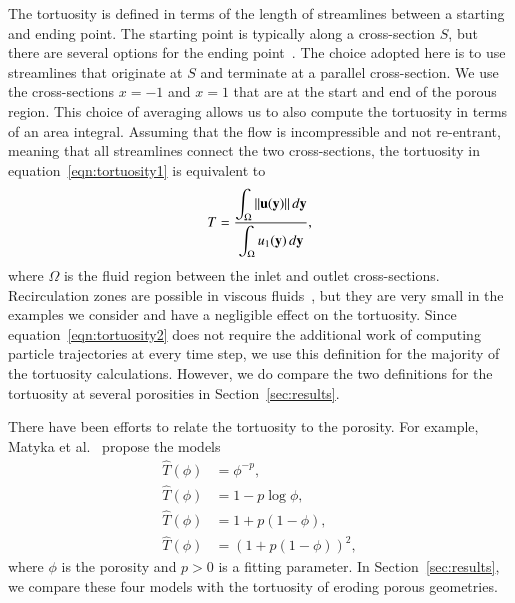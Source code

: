 \documentclass[preprint,10pt]{elsarticle}
\begin{document}
The tortuosity is defined in terms of the length of streamlines between
a starting and ending point. The starting point is typically along a
cross-section $S$, but there are several options for the ending
point~\cite{dud-koz-mat2011}.  The choice adopted here is to use
streamlines that originate at $S$ and terminate at a parallel
cross-section.  We use the cross-sections $x=-1$ and $x=1$ that are at
the start and end of the porous region.  This choice of averaging allows
us to also compute the tortuosity in terms of an area integral.
Assuming that the flow is incompressible and not re-entrant, meaning
that all streamlines connect the two cross-sections, the tortuosity in
equation~\eqref{eqn:tortuosity1} is equivalent to~\cite{dud-koz-mat2011}
\begin{align}
  T = \frac{\displaystyle\int_\Omega \|{\mathbf{u}}({\mathbf{y}})\|\, d{\mathbf{y}}}
           {\displaystyle\int_\Omega u_1({\mathbf{y}})\, d{\mathbf{y}}},
  \label{eqn:tortuosity2}
\end{align}
where $\Omega$ is the fluid region between the inlet and outlet
cross-sections.  Recirculation zones are possible in viscous
fluids~\cite{hig1985}, but they are very small in the examples we
consider and have a negligible effect on the tortuosity.  Since
equation~\eqref{eqn:tortuosity2} does not require the additional work of
computing particle trajectories at every time step, we use this
definition for the majority of the tortuosity calculations.  However, we
do compare the two definitions for the tortuosity at several porosities
in Section~\ref{sec:results}.

There have been efforts to relate the tortuosity to the porosity.  For
example, Matyka et al.~\cite{mat-kha-koz2008} propose the models
\begin{subequations}
  \label{eqn:tortuosityModels}
  \begin{align}
    \widehat{T}(\phi) &= \phi^{-p}, \\
    \widehat{T}(\phi) &= 1-p \log \phi, \\
    \widehat{T}(\phi) &= 1+p (1-\phi), \\
    \widehat{T}(\phi) &= (1+p (1-\phi))^2, 
  \end{align}
\end{subequations}
where $\phi$ is the porosity and $p>0$ is a fitting parameter.  In
Section~\ref{sec:results}, we compare these four models with the
tortuosity of eroding porous geometries.

\end{document}
